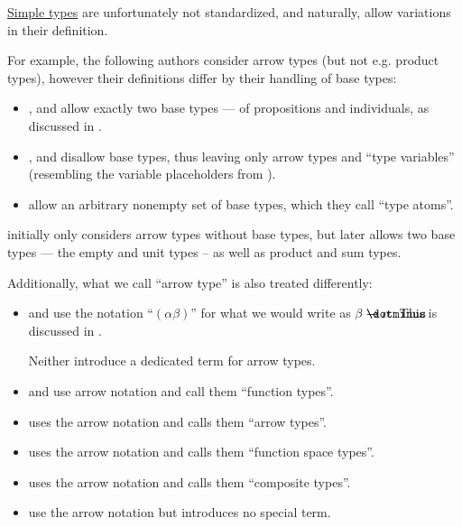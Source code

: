\begin{remark}\label{rem:simple_type_terminology_and_notation}
  \hyperref[def:simple_type]{Simple types} are unfortunately not standardized, and naturally, allow variations in their definition.

  For example, the following authors consider arrow types (but not e.g. product types), however their definitions differ by their handling of base types:
  \begin{itemize}
    \item {},  and  allow exactly two base types --- of propositions and individuals, as discussed in .

    \item {},  and  disallow base types, thus leaving only arrow types and \enquote{type variables} (resembling the variable placeholders from ).

    \item {} allow an arbitrary nonempty set of base types, which they call \enquote{type atoms}.
  \end{itemize}

   initially only considers arrow types without base types, but later allows two base types --- the empty and unit types -- as well as product and sum types.

  Additionally, what we call \enquote{arrow type} is also treated differently:
  \begin{itemize}
    \item {} and  use the notation \enquote{\( (\alpha\beta) \)} for what we would write as \( \beta \synimplies \alpha \). This is discussed in .

    Neither introduce a dedicated term for arrow types.

    \item {} and  use arrow notation and call them \enquote{function types}.

    \item {} uses the arrow notation and calls them \enquote{arrow types}.

    \item {} uses the arrow notation and calls them \enquote{function space types}.

    \item {} uses the arrow notation and calls them \enquote{composite types}.

    \item {} use the arrow notation but introduces no special term.
  \end{itemize}
\end{remark}

